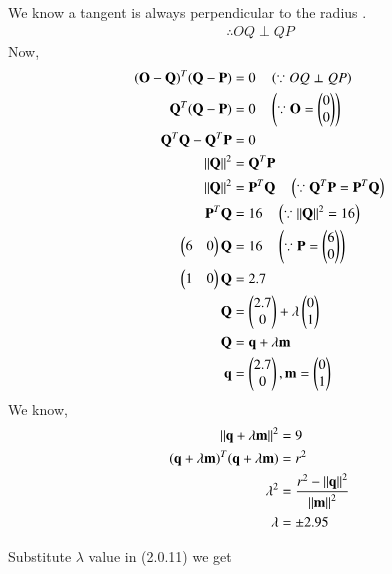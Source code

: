 \documentclass[journal,12pt,twocolumn]{IEEEtran}
\begin{document}
We know a tangent is always perpendicular to the radius .
\begin{align}
\therefore OQ \perp QP
\end{align}
Now,
\begin{align}
(\mathbf{O}-\mathbf{Q})^T (\mathbf{Q}-\mathbf{P}) &= 0 \quad \left(\because OQ \perp QP \right)
\\
\mathbf{Q}^T(\mathbf{Q}-\mathbf{P}) &= 0 \quad \left(\because \mathbf{O}=\begin{pmatrix}0\\0\end{pmatrix}\right)
\\
\mathbf{Q}^T \mathbf{Q} - \mathbf{Q}^T \mathbf{P} &= 0  
\\
\left\lVert\mathbf{Q}\right\rVert^2 &= \mathbf{Q}^T \mathbf{P}
\\
\left\lVert\mathbf{Q}\right\rVert^2 &= \mathbf{P}^T \mathbf{Q}  \quad \left(\because \mathbf{Q}^T \mathbf{P} = \mathbf{P}^T \mathbf{Q}\right)
\\
\mathbf{P}^T \mathbf{Q} &= 16 \quad \left(\because \left\lVert\mathbf{Q}\right\rVert^2 = 16\right)
\\
\begin{pmatrix}6&0\end{pmatrix} \mathbf{Q} &= 16 \quad \left(\because \mathbf{P} = \begin{pmatrix}6\\0\end{pmatrix} \right)
\\
\begin{pmatrix}1&0\end{pmatrix} \mathbf{Q} &= 2.7
\\
\mathbf{Q} &= \begin{pmatrix}2.7\\0\end{pmatrix} + \lambda \begin{pmatrix}0\\1\end{pmatrix}
\\
\mathbf{Q}&=\mathbf{q}+\lambda\mathbf{m}
\\
\mathbf{q}&=\begin{pmatrix}2.7\\ 0\end{pmatrix},\mathbf{m}=\begin{pmatrix}0\\1\end{pmatrix}
\end{align}
We know,
\begin{align}
\left\lVert\mathbf{q}+\lambda\mathbf{m}\right\rVert^2&=9
\\
(\mathbf{q}+\lambda \mathbf{m})^T(\mathbf{q}+\lambda \mathbf{m})&=r^2
\\
\lambda^2&=\frac{r^2-\left\lVert\mathbf{q}\right\rVert^2}{\left\lVert\mathbf{m}\right\rVert^2}
\\
\lambda &= \pm 2.95
\end{align}

Substitute $\lambda$  value in (2.0.11) we get
\end{document}
